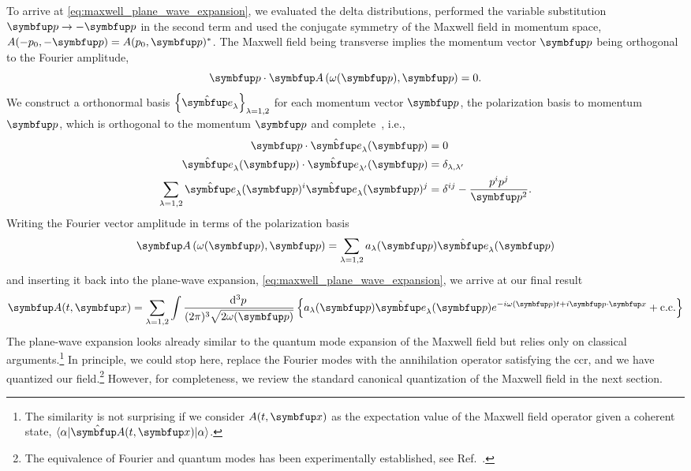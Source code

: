 To arrive at \cref{eq:maxwell_plane_wave_expansion}, we evaluated the delta distributions, performed the variable substitution $\vb{p}\to-\vb{p}$ in the second term and used the conjugate symmetry of the Maxwell field in momentum space, $A(-p_0,-\vb{p})=A(p_0,\vb{p})^*$.
The Maxwell field being transverse implies the momentum vector $\vb{p}$ being orthogonal to the Fourier amplitude,
\begin{equation}
	\vb{p}
	\vdot
	\vb{A}\left(\omega(\vb{p}),\vb{p}\right)
	=
	0
	.
\end{equation}
We construct a orthonormal basis $\left\{\vu{e}_\lambda\right\}_{\lambda=1,2}$ for each momentum vector $\vb{p}$, the polarization basis to momentum $\vb{p}$, which is orthogonal to the momentum $\vb{p}$ and complete~\cite[p.~341]{Srednicki2007}, i.e.,
\begin{align}
	\vb{p}
	\vdot
	\vu{e}_\lambda(\vb{p})
	&=
	0
	\\
	\vu{e}_\lambda(\vb{p})
	\vdot
	\vu{e}_{\lambda^\prime}(\vb{p})
	&=
	\delta_{\lambda,\lambda^\prime}
	\\
	\sum_{\lambda=1,2}
	\vu{e}_\lambda(\vb{p})^i
	\vu{e}_\lambda(\vb{p})^j
	&=
	\delta^{ij}
	-
	\frac{p^ip^j}{\vb{p}^2}
	.
\end{align}
Writing the Fourier vector amplitude in terms of the polarization basis
\begin{equation}
	\vb{A}\left(\omega(\vb{p}),\vb{p}\right)
	=
	\sum_{\lambda=1,2}
	a_\lambda(\vb{p})
	\vu{e}_\lambda(\vb{p})
\end{equation}
and inserting it back into the plane-wave expansion, \cref{eq:maxwell_plane_wave_expansion}, we arrive at our final result
\begin{equation}
	\vb{A}(t,\vb{x})
	=
	\sum_{\lambda=1,2}
	\int\frac{\dd[3]{p}}{(2\pi)^3\sqrt{2\omega(\vb{p})}}
	\left\{
		a_\lambda(\vb{p})
		\vu{e}_\lambda(\vb{p})
		e^{-i\omega(\vb{p})t+i\vb{p}\vdot\vb{x}}
		+
		\text{c.c.}
	\right\}
	\label{eq:maxwell_expansion}
\end{equation}
The plane-wave expansion looks already similar to the quantum mode expansion of the Maxwell field but relies only on classical arguments.\footnote{The similarity is not surprising if we consider $A(t,\vb{x})$ as the expectation value of the Maxwell field operator given a coherent state, $\bra{\alpha}\vu{A}(t,\vb{x})\ket{\alpha}$.}
In principle, we could stop here, replace the Fourier modes with the annihilation operator satisfying the \gls{ccr}, and we have quantized our field.\footnote{The equivalence of Fourier and quantum modes has been experimentally established, see Ref.~\cite{Hulet1985}.}
However, for completeness, we review the standard canonical quantization of the Maxwell field in the next section.

